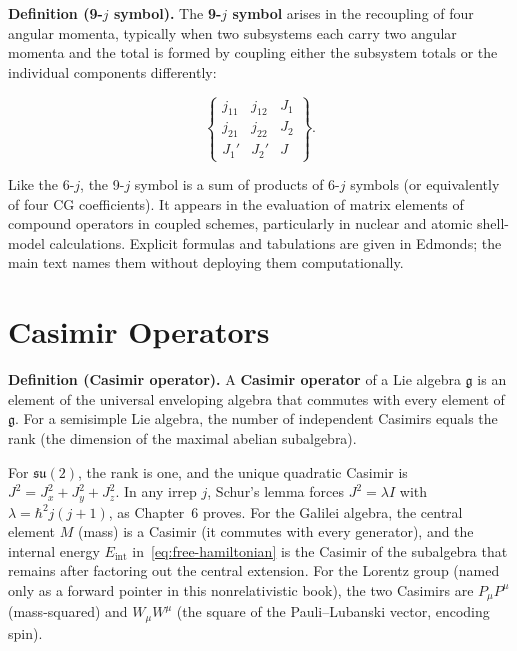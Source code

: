 \medskip\noindent\textbf{Definition (9-$j$ symbol).} The \textbf{9-$j$ symbol} arises in the recoupling of four angular momenta, typically when two subsystems each carry two angular momenta and the total is formed by coupling either the subsystem totals or the individual components differently:
\begin{linenomath}
    \begin{equation}
        \begin{Bmatrix}
            j_{11} & j_{12} & J_1 \\
            j_{21} & j_{22} & J_2 \\
            J_1'  & J_2'  & J
        \end{Bmatrix}.
        \label{eq:9j}
    \end{equation}
\end{linenomath}
Like the 6-$j$, the 9-$j$ symbol is a sum of products of 6-$j$ symbols (or equivalently of four CG coefficients). It appears in the evaluation of matrix elements of compound operators in coupled schemes, particularly in nuclear and atomic shell-model calculations. Explicit formulas and tabulations are given in Edmonds; the main text names them without deploying them computationally.

\section{Casimir Operators}
\label{sec:appendix-casimir}

\medskip\noindent\textbf{Definition (Casimir operator).} A \textbf{Casimir operator} of a Lie algebra $\mathfrak{g}$ is an element of the universal enveloping algebra that commutes with every element of $\mathfrak{g}$. For a semisimple Lie algebra, the number of independent Casimirs equals the rank (the dimension of the maximal abelian subalgebra).

For $\mathfrak{su}(2)$, the rank is one, and the unique quadratic Casimir is $J^2 = J_x^2 + J_y^2 + J_z^2$. In any irrep $j$, Schur's lemma forces $J^2 = \lambda I$ with $\lambda = \hbar^2 j(j+1)$, as Chapter~6 proves. For the Galilei algebra, the central element $M$ (mass) is a Casimir (it commutes with every generator), and the internal energy $E_{\mathrm{int}}$ in~\eqref{eq:free-hamiltonian} is the Casimir of the subalgebra that remains after factoring out the central extension. For the Lorentz group (named only as a forward pointer in this nonrelativistic book), the two Casimirs are $P_\mu P^\mu$ (mass-squared) and $W_\mu W^\mu$ (the square of the Pauli--Lubanski vector, encoding spin).

